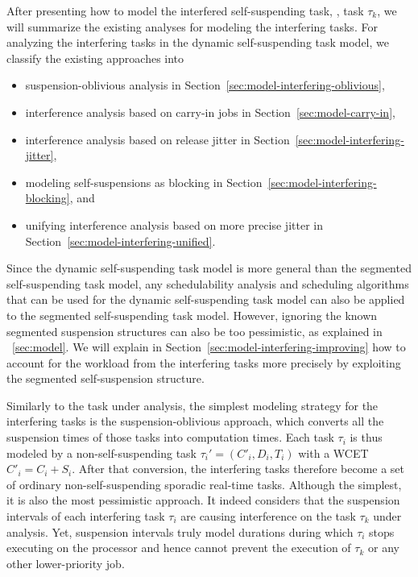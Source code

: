 \label{sec:model-interfering}

After presenting how to model the interfered self-suspending task, \ie, task $\tau_k$, we will summarize the existing analyses for modeling the interfering tasks. For analyzing the interfering tasks in the dynamic self-suspending task model, we classify the existing approaches into 
\begin{itemize}
\item suspension-oblivious analysis in Section~\ref{sec:model-interfering-oblivious}, 
\item interference analysis based on carry-in jobs in Section~\ref{sec:model-carry-in},
\item interference analysis based on release jitter in Section~\ref{sec:model-interfering-jitter},
\item modeling self-suspensions as blocking in Section~\ref{sec:model-interfering-blocking}, and
\item unifying interference analysis based on more precise jitter in Section~\ref{sec:model-interfering-unified}.
\end{itemize}
Since the dynamic self-suspending task model is more general than the segmented self-suspending task model, any schedulability analysis and scheduling algorithms that can be used for the dynamic self-suspending task model can also be applied to the segmented self-suspending task model. However, ignoring the known segmented suspension structures can also be too pessimistic, as explained in \mysectionref{}~\ref{sec:model}. We will explain in Section~\ref{sec:model-interfering-improving} how to account for the workload from the interfering tasks more precisely by exploiting the segmented self-suspension structure.

\label{sec:model-interfering-oblivious}

Similarly to the task under analysis, the simplest modeling strategy for the interfering tasks is the suspension-oblivious approach, which converts all the suspension times of those tasks into computation times. Each task $\tau_i$ is thus modeled by a non-self-suspending task $\tau_i' = (C'_i, D_i, T_i)$ with a WCET $C'_i = C_i+S_i$. After that conversion, the interfering tasks therefore become a set of ordinary non-self-suspending sporadic real-time tasks. Although the simplest, it is also the most pessimistic approach. It indeed considers that the suspension intervals of each interfering task $\tau_i$ are causing interference on the task $\tau_k$ under analysis. Yet, suspension intervals truly model durations during which $\tau_i$ stops executing on the processor and hence cannot prevent the execution of $\tau_k$ or any other lower-priority job.


